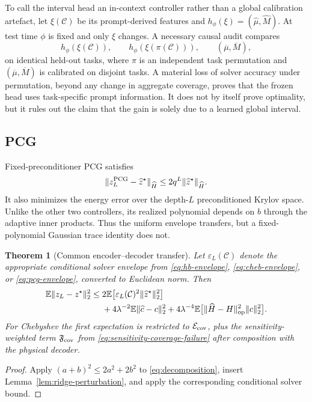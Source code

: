 \documentclass[11pt]{article}
\newtheorem{theorem}{Theorem}
\newcommand{\E}{\mathbb E}
\newcommand{\op}{\mathrm{op}}
\begin{document}
To call the interval head an in-context controller rather than a global
calibration artefact, let $\xi(\mathcal C)$ be its prompt-derived features and
$h_\phi(\xi)=(\widehat\mu,\widehat M)$.  At test time $\phi$ is fixed and only
$\xi$ changes.  A necessary causal audit compares
\begin{equation}
 h_\phi(\xi(\mathcal C)),\qquad
 h_\phi(\xi(\pi(\mathcal C))),\qquad
 (\overline\mu,\overline M),
 \label{eq:icl-causal-audit}
\end{equation}
on identical held-out tasks, where $\pi$ is an independent task permutation
and $(\overline\mu,\overline M)$ is calibrated on disjoint tasks.  A material
loss of solver accuracy under permutation, beyond any change in aggregate
coverage, proves that the frozen head uses task-specific prompt information.
It does not by itself prove optimality, but it rules out the claim that the
gain is solely due to a learned global interval.

\subsection{PCG}

Fixed-preconditioner PCG satisfies
\begin{equation}
 \|z_L^{\rm PCG}-\widehat z^\star\|_{\widehat H}
 \leq 2q^L\|\widehat z^\star\|_{\widehat H}.
 \label{eq:pcg-envelope}
\end{equation}
It also minimizes the energy error over the depth-$L$ preconditioned Krylov
space.  Unlike the other two controllers, its realized polynomial depends on
$\widehat b$ through the adaptive inner products.  Thus the uniform envelope
transfers, but a fixed-polynomial Gaussian trace identity does not.

\begin{theorem}[Common encoder--decoder transfer]
\label{thm:common-transfer}
Let $\varepsilon_L(\mathcal C)$ denote the appropriate conditional solver
envelope from \eqref{eq:hb-envelope}, \eqref{eq:cheb-envelope}, or
\eqref{eq:pcg-envelope}, converted to Euclidean norm.  Then
\begin{align}
 \E\|z_L-z^\star\|_2^2
 \leq{}&2\E\bigl[\varepsilon_L(\mathcal C)^2
 \|\widehat z^\star\|_2^2\bigr]\notag\\
 &+4\lambda^{-2}\E\|\widehat c-c\|_2^2
 +4\lambda^{-4}\E\bigl[
 \|\widehat H-H\|_{\op}^2\|c\|_2^2\bigr].
 \label{eq:common-transfer}
\end{align}
For Chebyshev the first expectation is restricted to
$\mathcal E_{\rm cov}$, plus the sensitivity-weighted term
$\mathfrak F_{\rm cov}$ from
\eqref{eq:sensitivity-coverage-failure} after composition with the physical
decoder.
\end{theorem}
\begin{proof}
Apply $(a+b)^2\leq2a^2+2b^2$ to
\eqref{eq:decomposition}, insert Lemma~\ref{lem:ridge-perturbation}, and apply
the corresponding conditional solver bound.
\end{proof}
\end{document}
